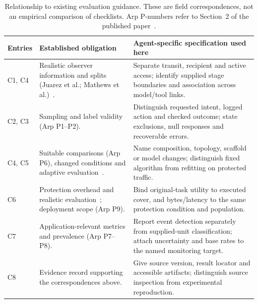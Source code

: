 \begin{table}[t]\centering\small
\caption{Relationship to existing evaluation guidance. These are field correspondences, not an empirical comparison of checklists. Arp P-numbers refer to Section~2 of the published paper~\cite{arp2022dos}.}\label{tab:guideline-crosswalk}
\setlength{\tabcolsep}{4pt}
\begin{tabularx}{\textwidth}{@{}P{.14\textwidth}P{.37\textwidth}Y@{}}\toprule
Entries & Established obligation & Agent-specific specification used here \\\midrule
C1, C4 & Realistic observer information and splits (Juarez et al.; Mathews et al.)~\cite{juarez2014critical,mathews2023critical}. & Separate transit, recipient and active access; identify supplied stage boundaries and association across model/tool links. \\\addlinespace[3pt]
C2, C3 & Sampling and label validity (Arp P1--P2). & Distinguish requested intent, logged action and checked outcome; state exclusions, null responses and recoverable errors. \\\addlinespace[3pt]
C4, C5 & Suitable comparisons (Arp P6), changed conditions and adaptive evaluation~\cite{juarez2014critical,mathews2023critical,tramer2020adaptive}. & Name composition, topology, scaffold or model changes; distinguish fixed algorithm from refitting on protected traffic. \\\addlinespace[3pt]
C6 & Protection overhead and realistic evaluation~\cite{dyer2012peekaboo,mathews2023critical}; deployment scope (Arp P9). & Bind original-task utility to executed cover, and bytes/latency to the same protection condition and population. \\\addlinespace[3pt]
C7 & Application-relevant metrics and prevalence (Arp P7--P8). & Report event detection separately from supplied-unit classification; attach uncertainty and base rates to the named monitoring target. \\\addlinespace[3pt]
C8 & Evidence record supporting the correspondences above. & Give source version, result locator and accessible artifacts; distinguish source inspection from experimental reproduction. \\
\bottomrule\end{tabularx}\end{table}
